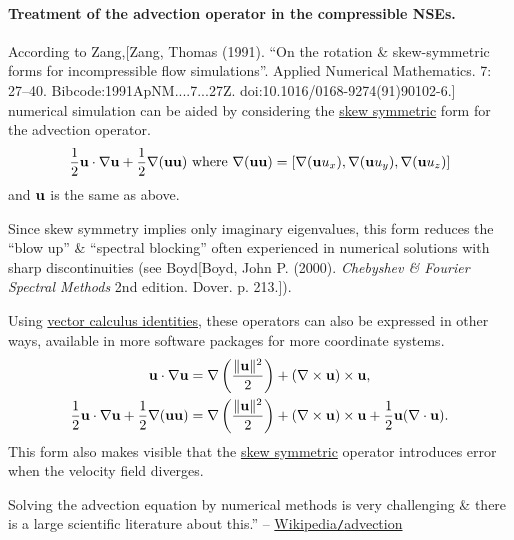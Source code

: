 \documentclass{article}
\begin{document}
\paragraph{Treatment of the advection operator in the compressible NSEs.} According to Zang,[Zang, Thomas (1991). ``On the rotation \& skew-symmetric forms for incompressible flow simulations''. Applied Numerical Mathematics. 7: 27--40. Bibcode:1991ApNM....7...27Z. doi:10.1016/0168-9274(91)90102-6.] numerical simulation can be aided by considering the \href{https://en.wikipedia.org/wiki/Skew-symmetric_matrix}{skew symmetric} form for the advection operator.
\begin{align*}
	\frac{1}{2}{\bf u}\cdot\nabla{\bf u} + \frac{1}{2}\nabla({\bf u}{\bf u}) \mbox{ where } \nabla({\bf u}{\bf u}) = \left[\nabla({\bf u}u_x),\nabla({\bf u}u_y),\nabla({\bf u}u_z)\right]
\end{align*}
and ${\bf u}$ is the same as above.

%
Since skew symmetry implies only imaginary eigenvalues, this form reduces the ``blow up'' \& ``spectral blocking'' often experienced in numerical solutions with sharp discontinuities (see Boyd[Boyd, John P. (2000). {\it Chebyshev \& Fourier Spectral Methods} 2nd edition. Dover. p. 213.]).

%
Using \href{https://en.wikipedia.org/wiki/Vector_calculus_identities#Vector_dot_product}{vector calculus identities}, these operators can also be expressed in other ways, available in more software packages for more coordinate systems.
\begin{align*}
	{\bf u}\cdot\nabla{\bf u} &= \nabla\left(\frac{\|{\bf u}\|^2}{2}\right) + (\nabla\times{\bf u})\times{\bf u},\\
	\frac{1}{2}{\bf u}\cdot\nabla{\bf u} + \frac{1}{2}\nabla({\bf u}{\bf u}) &= \nabla\left(\frac{\|{\bf u}\|^2}{2}\right) + (\nabla\times{\bf u})\times{\bf u} + \frac{1}{2}{\bf u}(\nabla\cdot{\bf u}).
\end{align*}
This form also makes visible that the \href{https://en.wikipedia.org/wiki/Skew-symmetric_matrix}{skew symmetric} operator introduces error when the velocity field diverges.

Solving the advection equation by numerical methods is very challenging \& there is a large scientific literature about this.'' -- \href{https://en.wikipedia.org/wiki/Advection}{Wikipedia{\tt/}advection}

\end{document}
